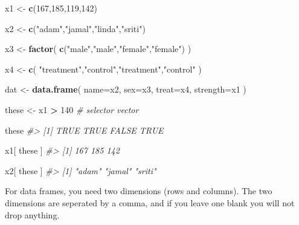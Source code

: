 \documentclass[]{book}
\newenvironment{Shaded}{\begin{snugshade}}{\end{snugshade}}
\newcommand{\CommentTok}[1]{\textcolor[rgb]{0.56,0.35,0.01}{\textit{#1}}}
\newcommand{\DataTypeTok}[1]{\textcolor[rgb]{0.13,0.29,0.53}{#1}}
\newcommand{\DecValTok}[1]{\textcolor[rgb]{0.00,0.00,0.81}{#1}}
\newcommand{\KeywordTok}[1]{\textcolor[rgb]{0.13,0.29,0.53}{\textbf{#1}}}
\newcommand{\NormalTok}[1]{#1}
\newcommand{\OperatorTok}[1]{\textcolor[rgb]{0.81,0.36,0.00}{\textbf{#1}}}
\newcommand{\StringTok}[1]{\textcolor[rgb]{0.31,0.60,0.02}{#1}}
\theoremstyle{definition}
\theoremstyle{definition}
\theoremstyle{definition}
\theoremstyle{remark}
\begin{document}
\begin{Shaded}
\begin{Highlighting}[]

\NormalTok{x1 <-}\StringTok{ }\KeywordTok{c}\NormalTok{(}\DecValTok{167}\NormalTok{,}\DecValTok{185}\NormalTok{,}\DecValTok{119}\NormalTok{,}\DecValTok{142}\NormalTok{)}

\NormalTok{x2 <-}\StringTok{ }\KeywordTok{c}\NormalTok{(}\StringTok{"adam"}\NormalTok{,}\StringTok{"jamal"}\NormalTok{,}\StringTok{"linda"}\NormalTok{,}\StringTok{"sriti"}\NormalTok{)}

\NormalTok{x3 <-}\StringTok{ }\KeywordTok{factor}\NormalTok{( }\KeywordTok{c}\NormalTok{(}\StringTok{"male"}\NormalTok{,}\StringTok{"male"}\NormalTok{,}\StringTok{"female"}\NormalTok{,}\StringTok{"female"}\NormalTok{) )}

\NormalTok{x4 <-}\StringTok{ }\KeywordTok{c}\NormalTok{( }\StringTok{"treatment"}\NormalTok{,}\StringTok{"control"}\NormalTok{,}\StringTok{"treatment"}\NormalTok{,}\StringTok{"control"}\NormalTok{ )}

\NormalTok{dat <-}\StringTok{ }\KeywordTok{data.frame}\NormalTok{( }\DataTypeTok{name=}\NormalTok{x2, }\DataTypeTok{sex=}\NormalTok{x3, }\DataTypeTok{treat=}\NormalTok{x4, }\DataTypeTok{strength=}\NormalTok{x1 )}


\NormalTok{these <-}\StringTok{ }\NormalTok{x1 }\OperatorTok{>}\StringTok{ }\DecValTok{140}     \CommentTok{# selector vector}

\NormalTok{these}
\CommentTok{#> [1]  TRUE  TRUE FALSE  TRUE}

\NormalTok{x1[ these ]}
\CommentTok{#> [1] 167 185 142}

\NormalTok{x2[ these ]}
\CommentTok{#> [1] "adam"  "jamal" "sriti"}
\end{Highlighting}
\end{Shaded}

For data frames, you need two dimensions (rows and columns). The two
dimensions are seperated by a comma, and if you leave one blank you will
not drop anything.
\end{document}
